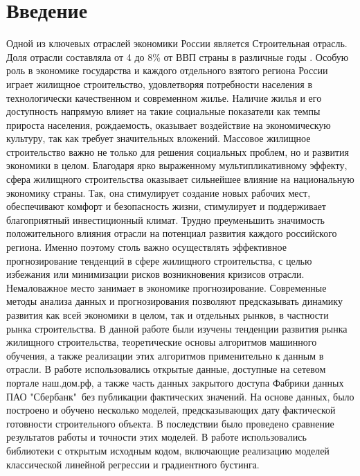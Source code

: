 \documentclass[12pt,a4paper]{article} %
\begin{document}
\newpage
\tableofcontents
 


\newpage
\section{Введение}

Одной из ключевых отраслей экономики России является Строительная отрасль. Доля отрасли составляла от 4 до 8\% от ВВП страны в различные годы \cite{stroyStat}. Особую роль в экономике государства и каждого отдельного взятого региона России играет жилищное строительство, удовлетворяя потребности населения в технологически качественном и современном жилье. Наличие жилья и его доступность напрямую влияет на такие социальные показатели как темпы прироста населения, рождаемость, оказывает воздействие на экономическую культуру, так как требует значительных вложений. Массовое жилищное строительство важно не только для решения социальных проблем, но и развития экономики в целом. 
Благодаря ярко выраженному мультипликативному эффекту, сфера жилищного строительства оказывает сильнейшее влияние на национальную экономику страны. Так, она стимулирует создание новых рабочих мест, обеспечивают комфорт и безопасность жизни, стимулирует и поддерживает благоприятный инвестиционный климат. Трудно преуменьшить значимость положительного влияния отрасли на потенциал развития каждого российского региона. Именно поэтому столь важно осуществлять эффективное прогнозирование тенденций в сфере жилищного строительства, с целью избежания или минимизации рисков возникновения кризисов отрасли. 
Немаловажное место занимает в экономике прогнозирование. Современные методы анализа данных и прогнозирования позволяют предсказывать динамику развития как всей экономики в целом, так и отдельных рынков, в частности рынка строительства. В данной работе были изучены тенденции развития рынка жилищного строительства, теоретические основы алгоритмов машинного обучения, а также реализации этих алгоритмов применительно к  данным в отрасли. В работе использовались открытые данные, доступные на сетевом портале наш.дом.рф, а также часть данных закрытого доступа Фабрики данных ПАО "Сбербанк"\ без публикации фактических значений. На основе данных, было построено и обучено несколько моделей, предсказывающих дату фактической готовности строительного объекта. В последствии было проведено сравнение результатов работы и точности этих моделей. В работе использовались библиотеки с открытым исходным кодом, включающие реализацию моделей классической линейной регрессии и градиентного бустинга.
\end{document}
